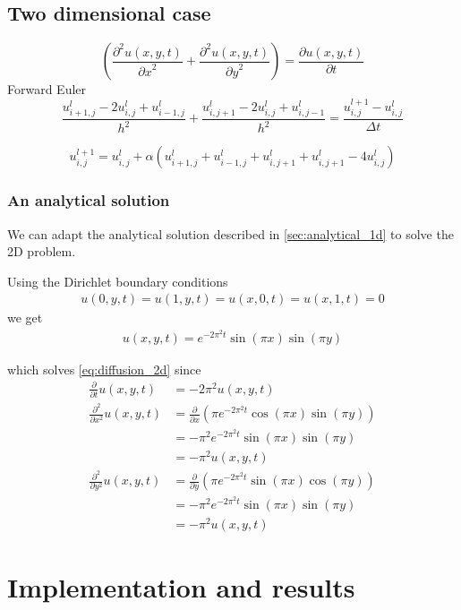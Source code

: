 \documentclass[10pt,a4paper]{article}
\newcommand{\dt}{{\Delta t}}
\newcommand{\fracpt}{\frac{\partial}{\partial t}}
\newcommand{\fracpx}{\frac{\partial}{\partial x}}
\newcommand{\fracpy}{\frac{\partial}{\partial y}}
\newcommand{\fracpxx}{\frac{\partial^2}{\partial x^2}}
\newcommand{\fracpyy}{\frac{\partial^2}{\partial y^2}}
\newcommand{\pt}{{\partial t}}
\newcommand{\px}{{\partial x}}
\newcommand{\py}{{\partial y}}
\newcommand{\pu}{{\partial u}}
\newcommand{\ppu}{{\partial^2 u}}
\begin{document}
\subsection{Two dimensional case}
\begin{equation}
\left(\frac{\ppu(x,y,t)}{\px^2} + \frac{\ppu(x,y,t)}{\py^2}\right) = \frac{\pu(x,y,t)}{\pt}
\label{eq:diffusion_2d}
\end{equation}
Forward Euler
\begin{equation}
\frac{u_{i+1,j}^l - 2u_{i,j}^l + u_{i-1,j}^l}{h^2} + \frac{u_{i,j+1}^l - 2u_{i,j}^l + u_{i,j-1}^l}{h^2} = \frac{u_{i,j}^{l+1} - u_{i,j}^l}{\dt}
\end{equation}

\begin{equation}
u_{i,j}^{l+1} = u_{i,j}^l + \alpha\left( u_{i+1,j}^l + u_{i-1,j}^l + u_{i,j+1}^l + u_{i,j+1}^l - 4u_{i,j}^l \right)
\end{equation}

\subsubsection{An analytical solution}
We can adapt the analytical solution described in \vref{sec:analytical_1d} to solve the 2D problem.

Using the Dirichlet boundary conditions
\begin{align}
u(0, y, t) = u(1, y, t) = u(x, 0, t) = u(x, 1, t) = 0
\end{align}
we get
\begin{align}\label{eq:analytical_2d}
    u(x, y, t) = e^{-2\pi^2 t} \sin(\pi x) \sin(\pi y)
\end{align}

which solves \vref{eq:diffusion_2d} since
\begin{align}
\fracpt u(x, y, t) &= -2\pi^2 u(x, y, t) \\
\fracpxx u(x, y, t) &= \fracpx \left( \pi e^{-2\pi^2 t} \cos(\pi x) \sin(\pi y) \right) \\
&= -\pi^2 e^{-2\pi^2 t} \sin(\pi x) \sin(\pi y) \\
&= -\pi^2 u(x, y, t) \\
\fracpyy u(x, y, t) &= \fracpy \left( \pi e^{-2\pi^2 t} \sin(\pi x) \cos(\pi y) \right) \\
&= -\pi^2 e^{-2\pi^2 t} \sin(\pi x) \sin(\pi y) \\
&= -\pi^2 u(x, y, t)
\end{align}

\section{Implementation and results}\label{sec:implementation_and_results}




{}
\end{document}
